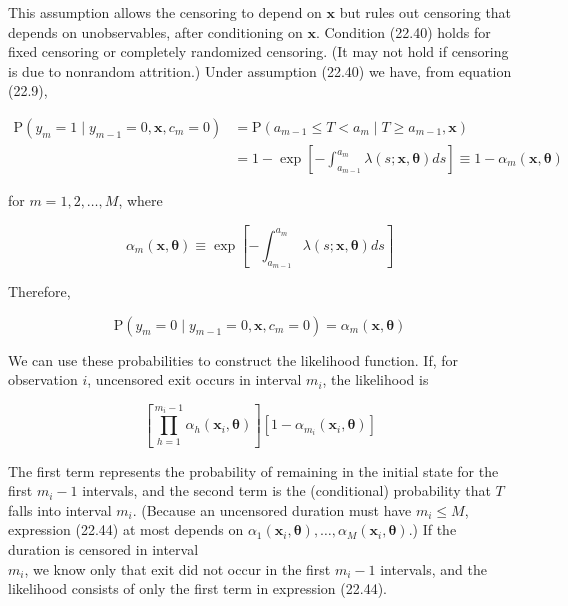 \documentclass[10pt]{article}
\begin{document}
This assumption allows the censoring to depend on $\mathbf{x}$ but rules out censoring that depends on unobservables, after conditioning on $\mathbf{x}$. Condition (22.40) holds for fixed censoring or completely randomized censoring. (It may not hold if censoring is due to nonrandom attrition.) Under assumption (22.40) we have, from equation (22.9),


\begin{align*}
\mathrm{P}\left(y_{m}=1 \mid y_{m-1}=0, \mathbf{x}, c_{m}=0\right) & =\mathrm{P}\left(a_{m-1} \leq T<a_{m} \mid T \geq a_{m-1}, \mathbf{x}\right) \\
& =1-\exp \left[-\int_{a_{m-1}}^{a_{m}} \lambda(s ; \mathbf{x}, \boldsymbol{\theta}) d s\right] \equiv 1-\alpha_{m}(\mathbf{x}, \boldsymbol{\theta}) \tag{22.41}
\end{align*}


for $m=1,2, \ldots, M$, where


\begin{equation*}
\alpha_{m}(\mathbf{x}, \boldsymbol{\theta}) \equiv \exp \left[-\int_{a_{m-1}}^{a_{m}} \lambda(s ; \mathbf{x}, \boldsymbol{\theta}) d s\right] \tag{22.42}
\end{equation*}


Therefore,


\begin{equation*}
\mathrm{P}\left(y_{m}=0 \mid y_{m-1}=0, \mathbf{x}, c_{m}=0\right)=\alpha_{m}(\mathbf{x}, \boldsymbol{\theta}) \tag{22.43}
\end{equation*}


We can use these probabilities to construct the likelihood function. If, for observation $i$, uncensored exit occurs in interval $m_{i}$, the likelihood is


\begin{equation*}
\left[\prod_{h=1}^{m_{i}-1} \alpha_{h}\left(\mathbf{x}_{i}, \boldsymbol{\theta}\right)\right]\left[1-\alpha_{m_{i}}\left(\mathbf{x}_{i}, \boldsymbol{\theta}\right)\right] \tag{22.44}
\end{equation*}


The first term represents the probability of remaining in the initial state for the first $m_{i}-1$ intervals, and the second term is the (conditional) probability that $T$ falls into interval $m_{i}$. (Because an uncensored duration must have $m_{i} \leq M$, expression (22.44) at most depends on $\alpha_{1}\left(\mathbf{x}_{i}, \boldsymbol{\theta}\right), \ldots, \alpha_{M}\left(\mathbf{x}_{i}, \boldsymbol{\theta}\right)$.) If the duration is censored in interval\\
$m_{i}$, we know only that exit did not occur in the first $m_{i}-1$ intervals, and the likelihood consists of only the first term in expression (22.44).
\end{document}
